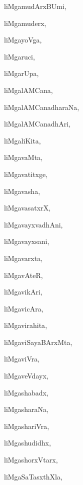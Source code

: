 \begin{multicols}{3}
{\noindent
{liMgamudArxBUmi}, \pageref{liMgamudArxBUmi}

\noindent
{liMgamuderx}, \pageref{liMgamuderx}

\noindent
{liMgayoVga}, \pageref{liMgayoVga}

\noindent
{liMgaruci}, \pageref{liMgaruci}

\noindent
{liMgarUpa}, \pageref{liMgarUpa}

\noindent
{liMgalAMCana}, \pageref{liMgalAMCana}

\noindent
{liMgalAMCanadharaNa}, \pageref{liMgalAMCanadharaNa}

\noindent
{liMgalAMCanadhAri}, \pageref{liMgalAMCanadhAri}

\noindent
{liMgaliKita}, \pageref{liMgaliKita}

\noindent
{liMgavaMta}, \pageref{liMgavaMta}

\noindent
{liMgavatitxge}, \pageref{liMgavatitxge}

\noindent
{liMgavasha}, \pageref{liMgavasha}

\noindent
{liMgavasatxrX}, \pageref{liMgavasatxrX}

\noindent
{liMgavayxvadhAni}, \pageref{liMgavayxvadhAni}

\noindent
{liMgavayxsani}, \pageref{liMgavayxsani}

\noindent
{liMgavarxta}, \pageref{liMgavarxta}

\noindent
{liMgavAteR}, \pageref{liMgavAteR}

\noindent
{liMgavikAri}, \pageref{liMgavikAri}

\noindent
{liMgavicAra}, \pageref{liMgavicAra}

\noindent
{liMgavirahita}, \pageref{liMgavirahita}

\noindent
{liMgaviSayaBArxMta}, \pageref{liMgaviSayaBArxMta}

\noindent
{liMgaviVra}, \pageref{liMgaviVra}

\noindent
{liMgaveVdayx}, \pageref{liMgaveVdayx}

\noindent
{liMgashabadx}, \pageref{liMgashabadx}

\noindent
{liMgasharaNa}, \pageref{liMgasharaNa}

\noindent
{liMgashariVra}, \pageref{liMgashariVra}

\noindent
{liMgashudidhx}, \pageref{liMgashudidhx}

\noindent
{liMgashorxVtarx}, \pageref{liMgashorxVtarx}

\noindent
{liMgaSaTasxthXla}, \pageref{liMgaSaTasxthXla}

}
\end{multicols}
